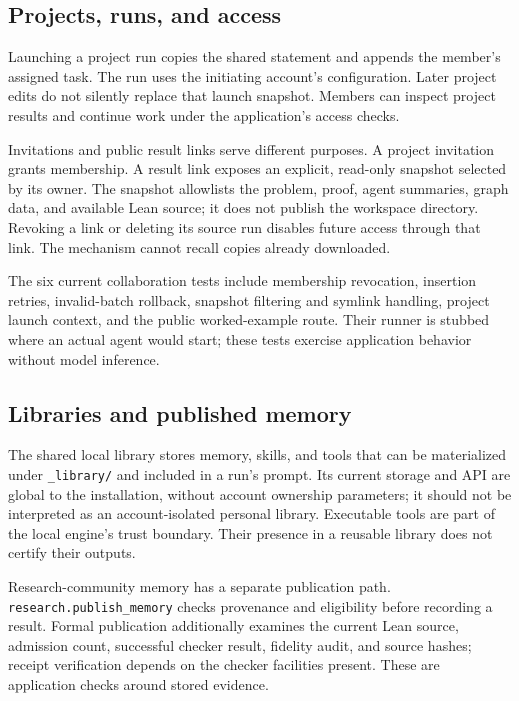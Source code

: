 \documentclass[10pt,letterpaper]{article}
\begin{document}
\subsection{Projects, runs, and access}

Launching a project run copies the shared statement and appends the member's assigned task. The run uses the initiating account's configuration. Later project edits do not silently replace that launch snapshot. Members can inspect project results and continue work under the application's access checks.

Invitations and public result links serve different purposes. A project invitation grants membership. A result link exposes an explicit, read-only snapshot selected by its owner. The snapshot allowlists the problem, proof, agent summaries, graph data, and available Lean source; it does not publish the workspace directory. Revoking a link or deleting its source run disables future access through that link. The mechanism cannot recall copies already downloaded.

The six current collaboration tests include membership revocation, insertion retries, invalid-batch rollback, snapshot filtering and symlink handling, project launch context, and the public worked-example route. Their runner is stubbed where an actual agent would start; these tests exercise application behavior without model inference.

\subsection{Libraries and published memory}

The shared local library stores memory, skills, and tools that can be materialized under \nolinkurl{_library/} and included in a run's prompt. Its current storage and API are global to the installation, without account ownership parameters; it should not be interpreted as an account-isolated personal library. Executable tools are part of the local engine's trust boundary. Their presence in a reusable library does not certify their outputs.

Research-community memory has a separate publication path. \nolinkurl{research.publish_memory} checks provenance and eligibility before recording a result. Formal publication additionally examines the current Lean source, admission count, successful checker result, fidelity audit, and source hashes; receipt verification depends on the checker facilities present. These are application checks around stored evidence.
\end{document}
